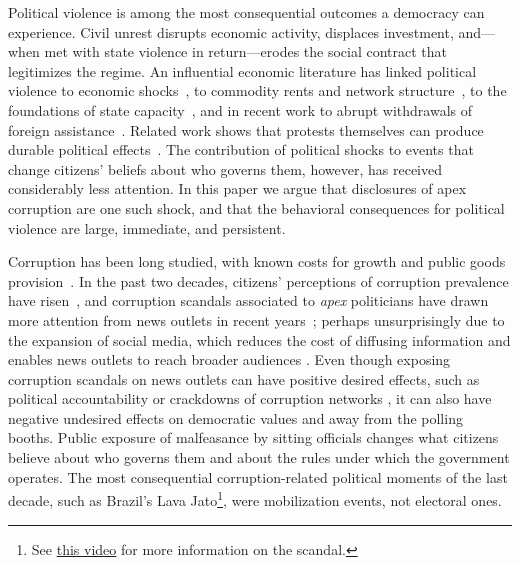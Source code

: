 \documentclass[11pt]{article}
\begin{document}
Political violence is among the most consequential outcomes a democracy can experience. Civil unrest disrupts economic activity, displaces investment, and---when met with state violence in return---erodes the social contract that legitimizes the regime. An influential economic literature has linked political violence to economic shocks~\citep{miguel2004economic,mcguirk2020economic}, to commodity rents and network structure~\citep{koenig2017networks,dube2013commodity}, to the foundations of state capacity~\citep{besley2011logic}, and in recent work to abrupt withdrawals of foreign assistance~\citep{rohner2026aidingpeace}. Related work shows that protests themselves can produce durable political effects~\citep{madestam2013protests,bursztyn2021persistent}. The contribution of political shocks to events that change citizens' beliefs about who governs them, however, has received considerably less attention. In this paper we argue that disclosures of apex corruption are one such shock, and that the behavioral consequences for political violence are large, immediate, and persistent.

Corruption has been long studied, with known costs for growth and public goods provision~\citep{mauro1995corruption,treisman2007what,olken2007monitoring,olken2012corruption,glaeser2006corruption}. In the past two decades, citizens' perceptions of corruption prevalence have risen~\citep{cantoni2024protests}, and corruption scandals associated to \textit{apex} politicians have drawn more attention from news outlets in recent years~\citep{ApexCorruption}; perhaps unsurprisingly due to the expansion of social media, which reduces the cost of diffusing information and enables news outlets to reach broader audiences \citep{enikolopov2018SocialMedia, tufekci2024twitter,dellavigna2007fox}. Even though exposing corruption scandals on news outlets can have positive desired effects, such as political accountability or crackdowns of corruption networks \citep{ferraz2011electoral, horacio2019infonetwork, horacio2022metaketa}, it can also have negative undesired effects on democratic values \citep{ajzenman2021powerexample, ApexCorruption} and away from the polling booths. Public exposure of malfeasance by sitting officials changes what citizens believe about who governs them and about the rules under which the government operates. The most consequential corruption-related political moments of the last decade, such as Brazil's Lava Jato\footnote{See \href{https://www.youtube.com/watch?v=boK0Mh2T5nk}{this video} for more information on the scandal.}, were mobilization events, not electoral ones.
\end{document}

